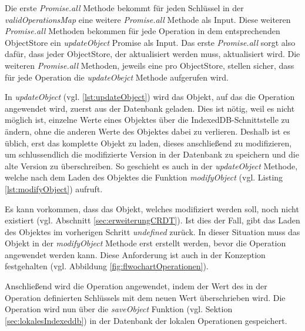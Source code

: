 \documentclass[a4paper, 12pt]{scrreprt}
\begin{document}
Die erste \textit{Promise.all} Methode bekommt für jeden Schlüssel in der \textit{validOperationsMap} eine weitere \textit{Promise.all} Methode als Input. Diese weiteren \textit{Promise.all} Methoden bekommen für jede Operation in dem entsprechenden ObjectStore ein \textit{updateObject} Promise als Input. Das erste \textit{Promise.all} sorgt also dafür, dass jeder ObjectStore, der aktualisiert werden muss, aktualisiert wird. Die weiteren \textit{Promise.all} Methoden, jeweils eine pro ObjectStore, stellen sicher, dass für jede Operation die \textit{updateObejct} Methode aufgerufen wird.

\begin{minipage}{\linewidth}
	
\end{minipage}

In \textit{updateObject} (vgl. \ref{lst:updateObject}) wird das Objekt, auf das die Operation angewendet wird, zuerst aus der Datenbank geladen. Dies ist nötig, weil es nicht möglich ist, einzelne Werte eines Objektes über die IndexedDB-Schnittstelle zu ändern, ohne die anderen Werte des Objektes dabei zu verlieren. Deshalb ist es üblich, erst das komplette Objekt zu laden, dieses anschließend zu modifizieren, um schlussendlich die modifizierte Version in der Datenbank zu speichern und die alte Version zu überschreiben. So geschieht es auch in der \textit{updateObject} Methode, welche nach dem Laden des Objektes die Funktion \textit{modifyObject} (vgl. Listing \ref{lst:modifyObject}) aufruft. 

\begin{minipage}{\linewidth}
	
\end{minipage}

Es kann vorkommen, dass das Objekt, welches modifiziert werden soll, noch nicht existiert (vgl. Abschnitt \ref{sec:erweiterungCRDT}). Ist dies der Fall, gibt das Laden des Objektes im vorherigen Schritt \textit{undefined} zurück. In dieser Situation muss das Objekt in der \textit{modifyObject} Methode erst erstellt werden, bevor die Operation angewendet werden kann. Diese Anforderung ist auch in der Konzeption festgehalten (vgl. Abbildung \ref{fig:flwochartOperationen}).

Anschließend wird die Operation angewendet, indem der Wert des in der Operation definierten Schlüssels mit dem neuen Wert überschrieben wird. Die Operation wird nun über die \textit{saveObject} Funktion (vgl. Sektion \ref{sec:lokalesIndexeddb}) in der Datenbank der lokalen Operationen gespeichert.
\end{document}
